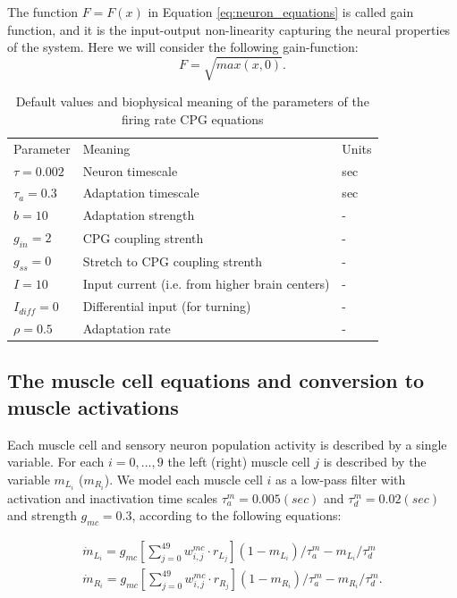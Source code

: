 \documentclass{cmc}
\begin{document}
The function $F=F(x)$ in Equation \ref{eq:neuron_equations} is called gain function, and it is the input-output non-linearity capturing the neural properties of the system. Here we will consider the following gain-function:
\begin{equation}
F=\sqrt{max(x,0)}.
\label{SReLu_eq}
\end{equation}


\begin{table}[h!]
\centering
\begin{tabular}{ l l l }
 Parameter & Meaning & Units \\
 $\tau=0.002$ & Neuron timescale & sec\\
 $\tau_a=0.3$ & Adaptation timescale & sec \\
 $b=10$ & Adaptation strength & - \\
 $g_{in}=2$ & CPG coupling strenth & -\\
 $g_{ss}=0$ & Stretch to CPG coupling strenth & -\\
 $I=10$ & Input current (i.e. from higher brain centers) & - \\
 $I_{diff}=0$ & Differential input (for turning) & - \\
 $\rho=0.5$ & Adaptation rate & -
\end{tabular}
\caption{Default values and biophysical meaning of the parameters of the firing rate CPG equations}
\label{table_par_CPG}
\end{table}


\subsection*{The muscle cell equations and conversion to muscle activations}

Each muscle cell and sensory neuron population activity is described by a single variable. For each $i=0,...,9$ the left (right) muscle cell $j$ is described by the variable $m_{L_i}$ ($m_{R_i}$). We model each muscle cell $i$ as a low-pass filter with activation and inactivation time scales $\tau^m_a=0.005 (sec)$ and $\tau^m_d=0.02 (sec)$ and strength $g_{mc}=0.3$, according to the following equations:

\begin{equation}
    \begin{array}{lcl}
	\dot{m}_{L_i} = g_{mc} \left[ \sum_{j=0}^{49} w^{mc}_{i,j} \cdot r_{L_j} \right] (1-m_{L_i}) / \tau^m_a - m_{L_i}/ \tau^m_d\\
	\dot{m}_{R_i} = g_{mc} \left[ \sum_{j=0}^{49} w^{mc}_{i,j} \cdot r_{R_j} \right] (1-m_{R_i}) / \tau^m_a - m_{R_i}/ \tau^m_d.
    \end{array}
	\label{eq:muscle_equations}
\end{equation}
\end{document}
